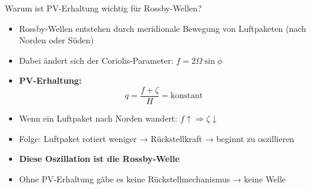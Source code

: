 \begin{frame}{Warum ist PV-Erhaltung wichtig für Rossby-Wellen?}
	\begin{itemize}
		\item Rossby-Wellen entstehen durch meridionale Bewegung von Luftpaketen (nach Norden oder Süden)
		\item Dabei ändert sich der Coriolis-Parameter: \( f = 2\Omega \sin\phi \)
		\item \textbf{PV-Erhaltung:} \[ q = \frac{f + \zeta}{H} = \text{konstant} \]
		\item Wenn ein Luftpaket nach Norden wandert: \( f \uparrow \Rightarrow \zeta \downarrow \)
		\item Folge: Luftpaket rotiert weniger → Rückstellkraft → beginnt zu oszillieren
		\item \textbf{Diese Oszillation ist die Rossby-Welle}
		\item Ohne PV-Erhaltung gäbe es keine Rückstellmechanismus → keine Welle
	\end{itemize}
\end{frame}




